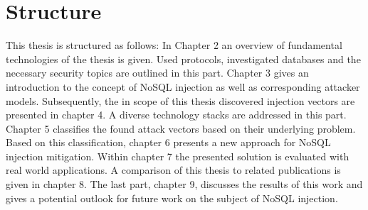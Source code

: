 \section{Structure}
This thesis is  structured as follows: In Chapter 2 an overview of fundamental technologies of the thesis is given. Used protocols, investigated databases and the necessary security topics are outlined in this part. Chapter 3 gives an introduction to the concept of NoSQL injection as well as corresponding attacker models. Subsequently, the in scope of this thesis discovered injection vectors are presented in chapter 4. A diverse technology stacks are addressed in this part. Chapter 5 classifies the found attack vectors based on their underlying problem. Based on this classification, chapter 6 presents a new approach for NoSQL injection mitigation. Within chapter 7 the presented solution is evaluated with real world applications. A comparison of this thesis to related publications is given in chapter 8. The last part, chapter 9, discusses the results of this work and gives a potential outlook for future work on the subject of NoSQL injection.
